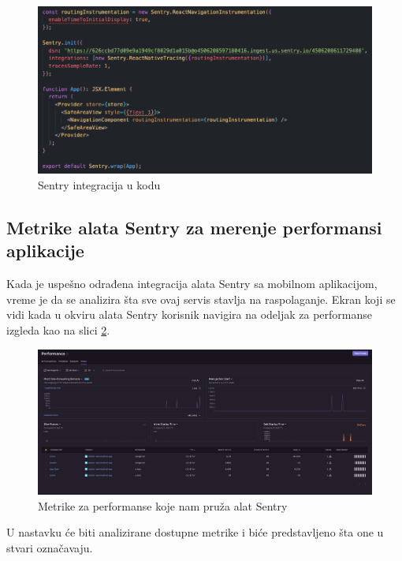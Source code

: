 \documentclass[12pt,oneside]{memoir}
\begin{document}
\begin{figure}[h]
    \centering
    \includegraphics[scale=0.5]{docs/images/chapterFive/sentryIntegration.png}
    \caption{Sentry integracija u kodu}
    \label{fig:sentryIntegration}
\end{figure}

\subsection{Metrike alata Sentry za merenje performansi aplikacije}

Kada je uspešno odrađena integracija alata Sentry sa mobilnom aplikacijom, vreme je da se analizira šta sve ovaj servis stavlja na raspolaganje. Ekran koji se vidi kada u okviru alata Sentry korisnik navigira na odeljak za performanse izgleda kao na slici \ref{fig:sentryMetrics}.

\begin{figure}[h]
    \centering
    \includegraphics[scale=0.2]{docs/images/chapterFive/sentryPerfMetrics.png}
    \caption{Metrike za performanse koje nam pruža alat Sentry}
    \label{fig:sentryMetrics}
\end{figure}

U nastavku će biti analizirane dostupne metrike\cite{SentryPerfMetrics} i biće predstavljeno šta one u stvari označavaju.
\end{document}
